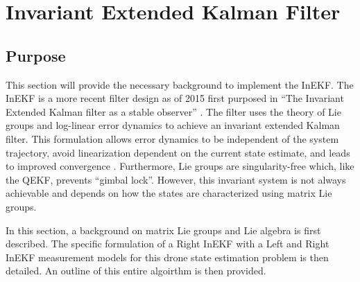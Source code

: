 \section{Invariant Extended Kalman Filter}
\subsection{Purpose}
This section will provide the necessary background to implement the InEKF. The InEKF is a more recent filter design as of 2015 first purposed in ``The Invariant Extended Kalman filter as a stable observer'' \cite{DBLP:journals/corr/BarrauB14}. The filter uses the theory of Lie groups and log-linear error dynamics to achieve an invariant extended Kalman filter. This formulation allows error dynamics to be independent of the system trajectory, avoid linearization dependent on the current state estimate, and leads to improved convergence \cite{Contact-Aided_Invarant_EKF}. Furthermore, Lie groups are singularity-free which, like the QEKF, prevents ``gimbal lock''. However, this invariant system is not always achievable and depends on how the states are characterized using matrix Lie groups.

In this section, a background on matrix Lie groups and Lie algebra is first described. The specific formulation of a Right InEKF with a Left and Right InEKF measurement models for this drone state estimation problem is then detailed. An outline of this entire algoirthm is then provided.


